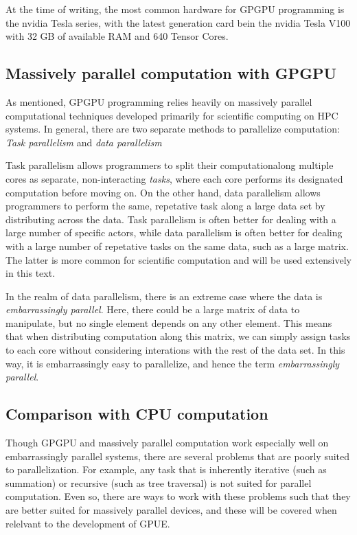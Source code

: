 At the time of writing, the most common hardware for GPGPU programming is the nvidia Tesla series, with the latest generation card bein the nvidia Tesla V100 with 32 GB of available RAM and 640 Tensor Cores.

\subsection{Massively parallel computation with GPGPU}

As mentioned, GPGPU programming relies heavily on massively parallel computational techniques developed primarily for scientific computing on HPC systems.
In general, there are two separate methods to parallelize computation: \textit{Task parallelism} and \textit{data parallelism}

Task parallelism allows programmers to split their computationalong multiple cores as separate, non-interacting \textit{tasks}, where each core performs its designated computation before moving on.
On the other hand, data parallelism allows programmers to perform the same, repetative task along a large data set by distributing across the data.
Task parallelism is often better for dealing with a large number of specific actors, while data parallelism is often better for dealing with a large number of repetative tasks on the same data, such as a large matrix.
The latter is more common for scientific computation and will be used extensively in this text.

In the realm of data parallelism, there is an extreme case where the data is \textit{embarrassingly parallel}.
Here, there could be a large matrix of data to manipulate, but no single element depends on any other element.
This means that when distributing computation along this matrix, we can simply assign tasks to each core without considering interations with the rest of the data set.
In this way, it is embarrassingly easy to parallelize, and hence the term \textit{embarrassingly parallel}.

\subsection{Comparison with CPU computation}

Though GPGPU and massively parallel computation work especially well on embarrassingly parallel systems, there are several problems that are poorly suited to parallelization.
For example, any task that is inherently iterative (such as summation) or recursive (such as tree traversal) is not suited for parallel computation.
Even so, there are ways to work with these problems such that they are better suited for massively parallel devices, and these will be covered when relelvant to the development of GPUE.

